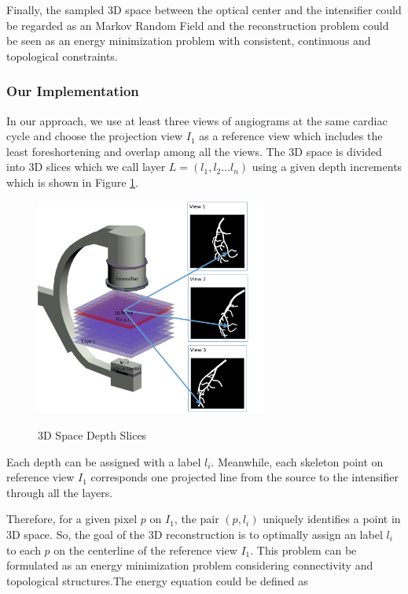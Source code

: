 Finally, the sampled 3D space between the optical center and the
intensifier could be regarded as an Markov Random Field and the
reconstruction problem could be seen as an energy minimization problem
with consistent, continuous and topological constraints.

\subsubsection{Our Implementation}
In our approach, we use at least three views of angiograms at the same
cardiac cycle and choose the projection view $I_{1}$ as a reference
view which includes the least foreshortening and overlap among all the
views. The 3D space is divided into 3D slices which we call layer
$L=(l_{1}, l_{2}...l_{n})$ using a given depth increments which is
shown in Figure \ref{fig:c_arm_slices}.

\begin{figure}
  \centering
  \includegraphics[width=3.0in]{c_arm_slices.png}\\
  \caption{3D Space Depth Slices}\label{fig:c_arm_slices}
\end{figure}

Each depth can be assigned with a label $l_{i}$. Meanwhile, each
skeleton point on reference view $I_{1}$ corresponds one projected
line from the source to the intensifier through all the layers.

Therefore, for a given pixel $p$ on $I_{1}$, the pair $(p,
l_{i})$ uniquely identifies a point in 3D space. So, the goal of the
3D reconstruction is to optimally assign an label $l_{i}$ to each $p$
on the centerline of the reference view $I_{1}$.  This problem can be
formulated as an energy minimization problem considering connectivity
and topological structures.The energy equation could be defined as

